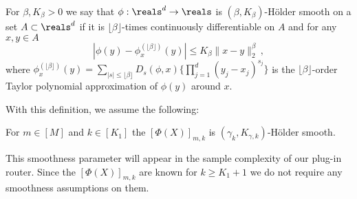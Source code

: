 \begin{definition}
   For $\beta, K_\beta >0$ we say that $\phi:\reals^d \to \reals$ is $(\beta, K_\beta)$-H\"older smooth on a set $ A \subset \reals^d$ if it is $\lfloor \beta \rfloor$-times continuously differentiable on $A$ and for any $x, y \in A $ 
   \begin{equation}
       |\phi(y) - \phi_x ^{(\lfloor \beta \rfloor)}(y)| \le K_\beta \|x - y\|_2^\beta\,,
   \end{equation} where 
$\phi_x ^{(\lfloor \beta \rfloor)}(y) = \sum_{|s| \le \lfloor \beta \rfloor} D_s(\phi, x) \{\prod_{j = 1}^d(y_j - x_j)^{s_j}\} $ is the $\lfloor \beta \rfloor$-order Taylor polynomial approximation of $\phi(y)$ around $x$. 
\end{definition}
With this definition, we assume the following:
\begin{assumption}\label{assmp:smooth}
    For $m \in [M]$ and $k \in [K_1]$ the 
    $[\Phi(X)]_{m, k}$ is $(\gamma_{k}, K_{\gamma, k})$-H\"older smooth. 
\end{assumption} 
This smoothness parameter will appear in the sample complexity of our  plug-in router. Since the $[\Phi(X)]_{m, k}$ are known for $k \ge K_1 + 1$ we do not require any smoothness assumptions on them.


